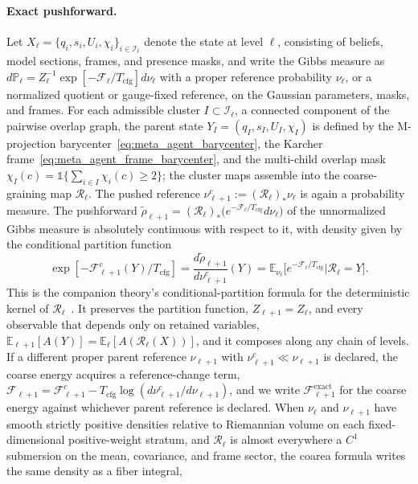 \paragraph{Exact pushforward.}
Let $X_\ell = \{q_i, s_i, U_i, \chi_i\}_{i \in \mathcal{I}_\ell}$ denote the state at level $\ell$, consisting of beliefs, model sections, frames, and presence masks, and write the Gibbs measure as $d\mathbb{P}_\ell = Z_\ell^{-1}\exp[-\mathcal{F}_\ell/T_{\mathrm{cfg}}]d\nu_\ell$ with a proper reference probability $\nu_\ell$, or a normalized quotient or gauge-fixed reference, on the Gaussian parameters, masks, and frames. For each admissible cluster $I \subset \mathcal{I}_\ell$, a connected component of the pairwise overlap graph, the parent state $Y_I = (q_I, s_I, U_I, \chi_I)$ is defined by the M-projection barycenter~\eqref{eq:meta_agent_barycenter}, the Karcher frame~\eqref{eq:meta_agent_frame_barycenter}, and the multi-child overlap mask $\chi_I(c) = \mathbb{1}\{\sum_{i \in I}\chi_i(c) \ge 2\}$; the cluster maps assemble into the coarse-graining map $\mathcal{R}_\ell$. The pushed reference $\nu^c_{\ell+1}:=(\mathcal{R}_\ell)_*\nu_\ell$ is again a probability measure. The pushforward $\widetilde{\rho}_{\ell+1} = (\mathcal{R}_\ell)_*\big(e^{-\mathcal{F}_\ell/T_{\mathrm{cfg}}}d\nu_\ell\big)$ of the unnormalized Gibbs measure is absolutely continuous with respect to it, with density given by the conditional partition function
\begin{equation}
\exp[-\mathcal{F}^{c}_{\ell+1}(Y)/T_{\mathrm{cfg}}]
=\frac{d\widetilde{\rho}_{\ell+1}}{d\nu^c_{\ell+1}}(Y)
=\mathbb{E}_{\nu_\ell}\big[e^{-\mathcal{F}_\ell/T_{\mathrm{cfg}}}\big|\mathcal{R}_\ell=Y\big].
\label{eq:rg_conditional_partition}
\end{equation}
This is the companion theory's conditional-partition formula for the deterministic kernel of $\mathcal{R}_\ell$~\cite[Ch.~11]{DennisGaugeVFE2026}. It preserves the partition function, $Z_{\ell+1} = Z_\ell$, and every observable that depends only on retained variables, $\mathbb{E}_{\ell+1}[A(Y)] = \mathbb{E}_\ell[A(\mathcal{R}_\ell(X))]$, and it composes along any chain of levels. If a different proper parent reference $\nu_{\ell+1}$ with $\nu^c_{\ell+1}\ll\nu_{\ell+1}$ is declared, the coarse energy acquires a reference-change term, $\mathcal{F}_{\ell+1}=\mathcal{F}^c_{\ell+1}-T_{\mathrm{cfg}}\log(d\nu^c_{\ell+1}/d\nu_{\ell+1})$, and we write $\mathcal{F}^{\mathrm{exact}}_{\ell+1}$ for the coarse energy against whichever parent reference is declared. When $\nu_\ell$ and $\nu_{\ell+1}$ have smooth strictly positive densities relative to Riemannian volume on each fixed-dimensional positive-weight stratum, and $\mathcal{R}_\ell$ is almost everywhere a $C^1$ submersion on the mean, covariance, and frame sector, the coarea formula writes the same density as a fiber integral,
